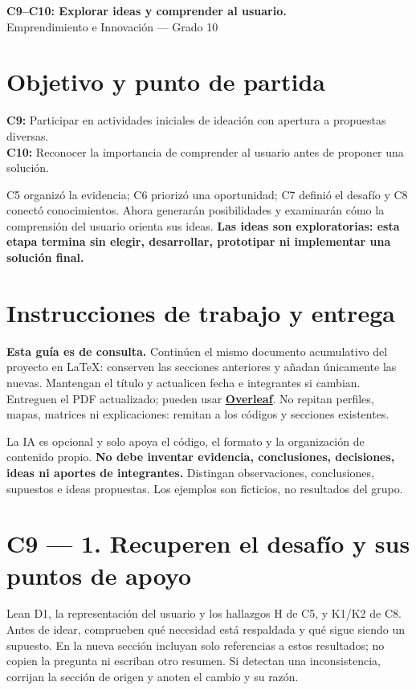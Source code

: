 \documentclass[12pt,a4paper]{article}
\newcommand{\guidelink}[2]{\href{#1}{\textcolor{LinkColor}{\textbf{\underline{#2}}}}}
\newcommand{\instruction}[1]{\textcolor{InstructionColor}{\textbf{#1}}}
\newcommand{\concept}[1]{\textcolor{ConceptColor}{\textbf{#1}}}
\begin{document}
\begin{center}
{\Large\bfseries\color{HeadingColor} C9--C10: Explorar ideas y comprender al usuario.}\\[3pt]
Emprendimiento e Innovación --- Grado 10
\end{center}

\section*{Objetivo y punto de partida}
\concept{C9:} Participar en actividades iniciales de ideación con apertura a propuestas diversas.\\
 \concept{C10:} Reconocer la importancia de comprender al usuario antes de proponer una solución. 
 
C5 organizó la evidencia; C6 priorizó una oportunidad; C7 definió el desafío y C8 conectó conocimientos. Ahora generarán posibilidades y examinarán cómo la comprensión del usuario orienta sus ideas. \instruction{Las ideas son exploratorias: esta etapa termina sin elegir, desarrollar, prototipar ni implementar una solución final.}

\section*{Instrucciones de trabajo y entrega}
\instruction{Esta guía es de consulta.} Continúen el mismo documento acumulativo del proyecto en LaTeX: conserven las secciones anteriores y añadan únicamente las nuevas. Mantengan el título y actualicen fecha e integrantes si cambian. Entreguen el PDF actualizado; pueden usar \guidelink{https://www.overleaf.com/}{Overleaf}. No repitan perfiles, mapas, matrices ni explicaciones: remitan a los códigos y secciones existentes.

La IA es opcional y solo apoya el código, el formato y la organización de contenido propio. \instruction{No debe inventar evidencia, conclusiones, decisiones, ideas ni aportes de integrantes.} Distingan observaciones, conclusiones, supuestos e ideas propuestas. Los ejemplos son ficticios, no resultados del grupo.
\section*{C9 --- 1. Recuperen el desafío y sus puntos de apoyo}
Lean D1, la representación del usuario y los hallazgos H de C5, y K1/K2 de C8. Antes de idear, comprueben qué necesidad está respaldada y qué sigue siendo un supuesto. En la nueva sección incluyan solo referencias a estos resultados; no copien la pregunta ni escriban otro resumen. Si detectan una inconsistencia, corrijan la sección de origen y anoten el cambio y su razón.
\end{document}
